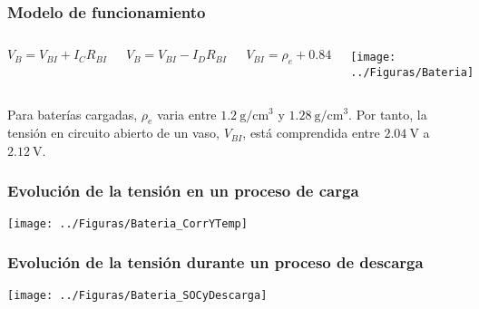 \documentclass[serif, xcolor=dvipsnames]{beamer}
\begin{document}
\begin{frame}
\frametitle{Modelo de funcionamiento}
\begin{columns}[c]%


\column{5cm}

\[
V_{B}=V_{BI}+I_{C}R_{BI}\]


\[
V_{B}=V_{BI}-I_{D}R_{BI}\]


\[
V_{BI}=\rho_{e}+0.84\]



\column{5cm}

\begin{center}
\texttt{[image: ../Figuras/Bateria]}
\par\end{center}

\end{columns}%
\begin{block}
{}

Para baterías cargadas, $\rho_{e}$ varia entre $\SI{1.2}{\gram\per\cm\cubed}$
y $\SI{1.28}{\gram\per\cm\cubed}$. Por tanto, la tensión en circuito
abierto de un vaso, $V_{BI}$, está comprendida entre $\SI{2.04}{\volt}$
a $\SI{2.12}{\volt}$.

\end{block}

\end{frame}

\begin{frame}[plain]
\frametitle{Evolución de la tensión en un proceso de carga}

\begin{center}
\texttt{[image: ../Figuras/Bateria\_CorrYTemp]}
\par\end{center}


\end{frame}

\begin{frame}[plain]
\frametitle{Evolución de la tensión durante un proceso de descarga}

\begin{center}
\texttt{[image: ../Figuras/Bateria\_SOCyDescarga]}
\par\end{center}


\end{frame}
\end{document}
